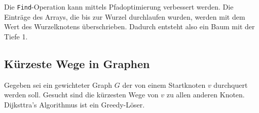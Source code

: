\documentclass[a4paper, 12pt]{article}
\begin{document}
	Die \texttt{Find}-Operation kann mittels Pfadoptimierung verbessert werden. Die Einträge des Arrays, die bis zur Wurzel durchlaufen wurden, werden mit dem Wert des Wurzelknotens überschrieben. Dadurch entsteht also ein Baum mit der Tiefe 1.
	\subsection{Kürzeste Wege in Graphen}
	Gegeben sei ein gewichteter Graph $G$ der von einem Startknoten $v$ durchquert werden soll. Gesucht sind die kürzesten Wege von $v$ zu allen anderen Knoten.\\
	Dijksttra's Algorithmus ist ein Greedy-Löser.
\end{document}
